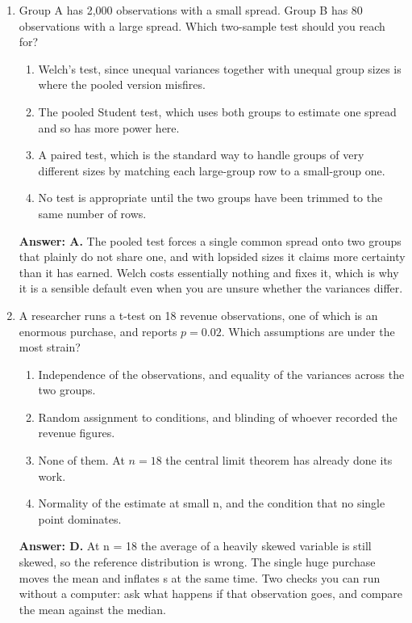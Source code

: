 \documentclass[11pt]{article}
\begin{document}
\begin{enumerate}[itemsep=14pt]
\item Group A has 2,000 observations with a small spread. Group B has 80 observations with a large spread. Which two-sample test should you reach for?

\begin{enumerate}[label=\Alph*., itemsep=1pt, topsep=3pt]
  \item Welch's test, since unequal variances together with unequal group sizes is where the pooled version misfires.
  \item The pooled Student test, which uses both groups to estimate one spread and so has more power here.
  \item A paired test, which is the standard way to handle groups of very different sizes by matching each large-group row to a small-group one.
  \item No test is appropriate until the two groups have been trimmed to the same number of rows.
\end{enumerate}

\vspace{2pt}
\textbf{Answer: A.} The pooled test forces a single common spread onto two groups that plainly do not share one, and with lopsided sizes it claims more certainty than it has earned. Welch costs essentially nothing and fixes it, which is why it is a sensible default even when you are unsure whether the variances differ.
\vspace{4pt}

\item A researcher runs a t-test on 18 revenue observations, one of which is an enormous purchase, and reports $p = 0.02$. Which assumptions are under the most strain?

\begin{enumerate}[label=\Alph*., itemsep=1pt, topsep=3pt]
  \item Independence of the observations, and equality of the variances across the two groups.
  \item Random assignment to conditions, and blinding of whoever recorded the revenue figures.
  \item None of them. At $n = 18$ the central limit theorem has already done its work.
  \item Normality of the estimate at small n, and the condition that no single point dominates.
\end{enumerate}

\vspace{2pt}
\textbf{Answer: D.} At n = 18 the average of a heavily skewed variable is still skewed, so the reference distribution is wrong. The single huge purchase moves the mean and inflates s at the same time. Two checks you can run without a computer: ask what happens if that observation goes, and compare the mean against the median.
\vspace{4pt}


\end{enumerate}
\end{document}

